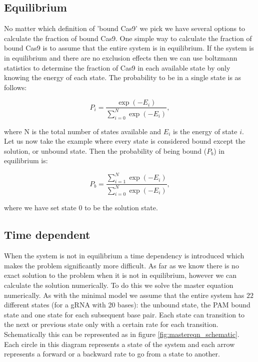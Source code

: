 \subsection{Equilibrium}

No matter which definition of 'bound Cas9' we pick we have several options to calculate the fraction of bound Cas9. One simple way to calculate the fraction of bound Cas9 is to assume that the entire system is in equilibrium. If the system is in equilibrium and there are no exclusion effects then we can use boltzmann statistics to determine the fraction of Cas9 in each available state by only knowing the energy of each state. The probability to be in a single state is as follows:

\begin{equation}
P_i = \frac{\exp{(-E_i)}}{\sum_{i=0}^{N}\exp{(-E_i)}},
\end{equation}

where N is the total number of states available and $E_i$ is the energy of state $i$. Let us now take the example where every state is considered bound except the solution, or unbound state. Then the probability of being bound ($P_b$) in equilibrium is:

\begin{equation}
P_b = \frac{\sum_{i=1}^{N}\exp{(-E_i)}}{\sum_{i=0}^{N}\exp{(-E_i)}},
\end{equation}

where we have set state 0 to be the solution state.

\subsection{Time dependent}


When the system is not in equilibrium a time dependency is introduced which makes the problem significantly more difficult. As far as we know there is no exact solution to the problem when it is not in equilibrium, however we can calculate the solution numerically. To do this we solve the master equation numerically. As with the minimal model we assume that the entire system has $22$ different states (for a gRNA with 20 bases): the unbound state, the PAM bound state and one state for each subsequent base pair. Each state can transition to the next or previous state only with a certain rate for each transition. Schematically this can be represented as in figure \ref{fig:mastereqn_schematic}. Each circle in this diagram represents a state of the system and each arrow represents a forward or a backward rate to go from a state to another.

